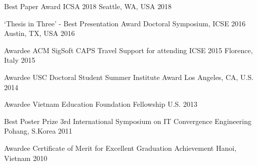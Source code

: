 \vspace{-1mm}



\begin{cvhonors}

  \cvhonor
    {Best Paper Award} %
    {ICSA 2018} %
    {Seattle, WA, USA} %
    {2018} %

  \cvhonor
    {`Thesis in Three' - Best Presentation Award} %
    {Doctoral Symposium, ICSE 2016} %
    {Austin, TX, USA} %
    {2016} %

  \cvhonor
    {Awardee} %
    {ACM SigSoft CAPS Travel Support for attending ICSE 2015} %
    {Florence, Italy} %
    {2015} %

  \cvhonor
    {Awardee} %
    {USC Doctoral Student Summer Institute Award} %
    {Los Angeles, CA, U.S.} %
    {2014} %

  \cvhonor
    {Awardee} %
    {Vietnam Education Foundation Fellowship} %
    {U.S.} %
    {2013} %

  \cvhonor
    {Best Poster Prize} %
    {%
    	3rd International Symposium on IT Convergence Engineering} %
    {Pohang, S.Korea} %
    {2011} %
   

	\cvhonor
	{Awardee} %
	{Certificate of Merit for Excellent Graduation Achievement} %
	{Hanoi, Vietnam} %
	{2010} %

\end{cvhonors}

